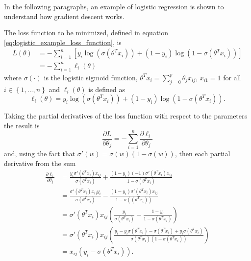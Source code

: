 In the following paragraphs, an example of logistic regression is shown to understand how gradient descent works.

The loss function to be minimized, defined in equation \eqref{eq:logistic_example_loss_function}, is
\begin{equation}
  \begin{split}
    L(\theta) & = - \sum_{i=1}^{n} \left[ y_i \log(\sigma(\theta^T x_i)) + (1-y_i) \log(1-\sigma(\theta^T x_i)) \right] \\
    & = - \sum_{i=1}^{n}{\ell_i(\theta)}
  \end{split}
\end{equation}
where $\sigma(\cdot)$ is the logistic sigmoid function, $\theta^T x_i = \sum_{j=0}^{p}{\theta_j x_{ij}}$, $x_{i1} = 1$ for all $i \in \left\{1, ..., n \right\}$ and $\ell_i(\theta)$ is defined as
\begin{equation}
  \ell_i(\theta) = y_i \log(\sigma(\theta^T x_i)) + (1-y_i) \log(1-\sigma(\theta^T x_i)).
\end{equation}

Taking the partial derivatives of the loss function with respect to the parameters the result is
\begin{equation}
  \frac{\partial L}{\partial \theta_j} = - \sum_{i = 1}^n { \frac{\partial \ell_i}{\partial \theta_j} }
\end{equation}
and, using the fact that $\sigma'(w) = \sigma(w)(1-\sigma(w))$, then each partial derivative from the sum
\begin{equation}
  \begin{split}
    \frac{\partial \ell_i}{\partial \theta_j} & =
    \frac{y_i \sigma'(\theta^T x_i) x_{ij} }  {\sigma(\theta^T x_i)} + \frac{(1 - y_i) (-1) \sigma'(\theta^T x_i) x_{ij}} {1 - \sigma(\theta^T x_i)} \\
    & = \frac{\sigma'(\theta^T x_i) x_{ij} y_i}{\sigma(\theta^T x_i)} - \frac{(1 - y_i) \sigma'(\theta^T x_i) x_{ij}}{1 - \sigma((\theta^T x_i))} \\
    & = \sigma'(\theta^T x_i) x_{ij} \left(\frac{y_i}{\sigma(\theta^T x_i)} - \frac{1-y_i}{1-\sigma(\theta^T x_i)} \right) \\
    & = \sigma'(\theta^T x_i) x_{ij} \left(\frac{y_i - y_i \sigma(\theta^T x_i) -
    \sigma(\theta^T x_i) + y_i \sigma(\theta^T x_i)}{\sigma(\theta^T x_i)(1-\sigma(\theta^T x_i))} \right) \\
    & = x_{ij}(y_i - \sigma(\theta^T x_i)).
  \end{split}
\end{equation}

